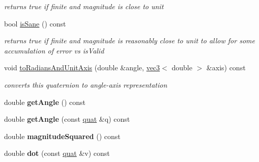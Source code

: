 \begin{DoxyCompactItemize}
\begin{DoxyCompactList}\small\item\em returns true if finite and magnitude is close to unit \item\end{DoxyCompactList}\item 
\hypertarget{classmath_1_1quat_a1ba9cba4f4688f2e82de0078af1bcf52}{
bool \hyperlink{classmath_1_1quat_a1ba9cba4f4688f2e82de0078af1bcf52}{isSane} () const }
\label{classmath_1_1quat_a1ba9cba4f4688f2e82de0078af1bcf52}

\begin{DoxyCompactList}\small\item\em returns true if finite and magnitude is reasonably close to unit to allow for some accumulation of error vs isValid \item\end{DoxyCompactList}\item 
\hypertarget{classmath_1_1quat_acf30faafb93a587a99fe6d2f99c24a45}{
void \hyperlink{classmath_1_1quat_acf30faafb93a587a99fe6d2f99c24a45}{toRadiansAndUnitAxis} (double \&angle, \hyperlink{classmath_1_1vec3}{vec3}$<$ double $>$ \&axis) const }
\label{classmath_1_1quat_acf30faafb93a587a99fe6d2f99c24a45}

\begin{DoxyCompactList}\small\item\em converts this quaternion to angle-\/axis representation \item\end{DoxyCompactList}\item 
\hypertarget{classmath_1_1quat_a9c5919a9230a3207663b2da1f982a714}{
double {\bfseries getAngle} () const }
\label{classmath_1_1quat_a9c5919a9230a3207663b2da1f982a714}

\item 
\hypertarget{classmath_1_1quat_a22f97cf89cb83fbdeddbcdf7cd360f4f}{
double {\bfseries getAngle} (const \hyperlink{classmath_1_1quat}{quat} \&q) const }
\label{classmath_1_1quat_a22f97cf89cb83fbdeddbcdf7cd360f4f}

\item 
\hypertarget{classmath_1_1quat_abe53d7e37a35f982393d8c1b7c0d9397}{
double {\bfseries magnitudeSquared} () const }
\label{classmath_1_1quat_abe53d7e37a35f982393d8c1b7c0d9397}

\item 
\hypertarget{classmath_1_1quat_a559847bc6ecc61f2315d21bf5d56abb5}{
double {\bfseries dot} (const \hyperlink{classmath_1_1quat}{quat} \&v) const }
\label{classmath_1_1quat_a559847bc6ecc61f2315d21bf5d56abb5}


\end{DoxyCompactItemize}
